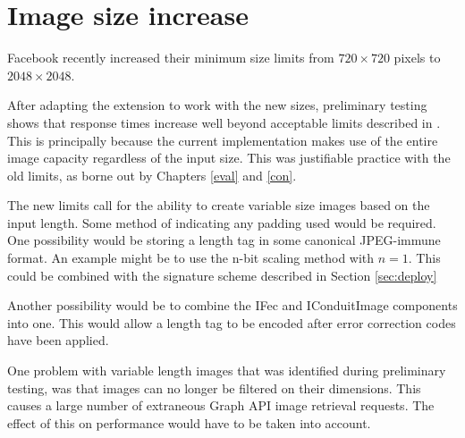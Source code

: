 \chapter{Image size increase}
\label{app:imginc}

Facebook recently increased their minimum size limits from $720 \times 720$ pixels to $2048 \times 2048$. 

After adapting the extension to work with the new sizes, preliminary testing shows that response times increase well beyond acceptable limits described in \cite{response}. This is principally because the current implementation makes use of the entire image capacity regardless of the input size. This was justifiable practice with the old limits, as borne out by Chapters \ref{eval} and \ref{con}.

The new limits call for the ability to create variable size images based on the input length. Some method of indicating any padding used would be required. One possibility would be storing a length tag in some canonical JPEG-immune format. An example might be to use the n-bit scaling method with $n=1$. This could be combined with the signature scheme described in Section \ref{sec:deploy}

Another possibility would be to combine the IFec and IConduitImage components into one. This would allow a length tag to be encoded after error correction codes have been applied.

One problem with variable length images that was identified during preliminary testing, was that images can no longer be filtered on their dimensions. This causes a large number of extraneous Graph API image retrieval requests. The effect of this on performance would have to be taken into account.